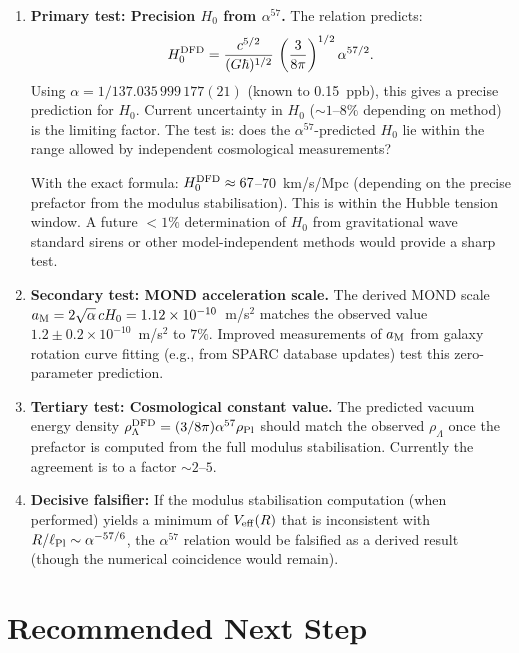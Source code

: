 \documentclass[11pt,a4paper]{article}
\newcommand{\Hzero}{H_0}
\newcommand{\alphafine}{\alpha}
\newcommand{\aM}{a_{\rm M}}
\newcommand{\ee}[1]{\times 10^{#1}}
\begin{document}
\begin{enumerate}
\item \textbf{Primary test: Precision $\Hzero$ from $\alpha^{57}$.}
  The relation predicts:
  \begin{equation}
  \Hzero^{\rm DFD} = \frac{c^{5/2}}{(G\hbar)^{1/2}}\,
  \left(\frac{3}{8\pi}\right)^{1/2}\alphafine^{57/2}.
  \end{equation}
  Using $\alpha = 1/137.035\,999\,177(21)$ (known to 0.15~ppb), this
  gives a precise prediction for $\Hzero$. Current uncertainty in
  $\Hzero$ ($\sim 1$--$8\%$ depending on method) is the limiting factor.
  The test is: does the $\alpha^{57}$-predicted $\Hzero$ lie within the
  range allowed by independent cosmological measurements?

  With the exact formula: $\Hzero^{\rm DFD} \approx 67$--$70$~km/s/Mpc
  (depending on the precise prefactor from the modulus stabilisation).
  This is within the Hubble tension window. A future $< 1\%$ determination
  of $\Hzero$ from gravitational wave standard sirens or other
  model-independent methods would provide a sharp test.

\item \textbf{Secondary test: MOND acceleration scale.} The derived
  MOND scale $\aM = 2\sqrt{\alpha}\,c\Hzero = 1.12\ee{-10}$~m/s$^2$
  matches the observed value $1.2 \pm 0.2\ee{-10}$~m/s$^2$ to $7\%$.
  Improved measurements of $\aM$ from galaxy rotation curve fitting
  (e.g., from SPARC database updates) test this zero-parameter
  prediction.

\item \textbf{Tertiary test: Cosmological constant value.} The predicted
  vacuum energy density
  $\rho_\Lambda^{\rm DFD} = (3/8\pi)\alphafine^{57}\rho_{\rm Pl}$
  should match the observed $\rho_\Lambda$ once the prefactor is
  computed from the full modulus stabilisation. Currently the agreement
  is to a factor $\sim 2$--$5$.

\item \textbf{Decisive falsifier:} If the modulus stabilisation
  computation (when performed) yields a minimum of $V_{\rm eff}(R)$
  that is inconsistent with $R/\ell_{\rm Pl} \sim \alphafine^{-57/6}$,
  the $\alpha^{57}$ relation would be falsified as a derived result
  (though the numerical coincidence would remain).
\end{enumerate}

\section{Recommended Next Step}
\label{sec:next}
\end{document}

